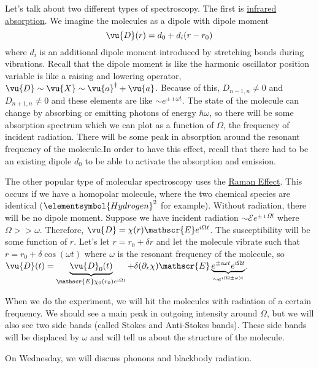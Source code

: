 \documentclass[a4paper,twoside,master.tex]{subfiles}
\begin{document}
Let's talk about two different types of spectroscopy. The first is \underline{infrared absorption}. We imagine the molecules as a dipole with dipole moment
\begin{equation}
    \vu{D}(r) = d_0 + d_i(r-r_0)
\end{equation}
where $ d_i $ is an additional dipole moment introduced by stretching bonds during vibrations. Recall that the dipole moment is like the harmonic oscillator position variable is like a raising and lowering operator, $ \vu{D} \sim \vu{X} \sim \vu{a}^\dagger + \vu{a} $. Because of this, $ D_{n-1, n} \neq 0 $ and $ D_{n+1,n} \neq 0 $ and these elements are like $ \sim e^{\pm\imath\omega t} $. The state of the molecule can change by absorbing or emitting photons of energy $ \hbar \omega $, so there will be some absorption spectrum which we can plot as a function of $ \Omega $, the frequency of incident radiation. There will be some peak in absorption around the resonant frequency of the molecule.In order to have this effect, recall that there had to be an existing dipole $ d_0 $ to be able to activate the absorption and emission.

The other popular type of molecular spectroscopy uses the \underline{Raman Effect}. This occurs if we have a homopolar molecule, where the two chemical species are identical ($ \elementsymbol{Hydrogen}^2 $ for example). Without radiation, there will be no dipole moment. Suppose we have incident radiation $ \sim \mathscr{E} e^{\pm \imath \Omega t} $ where $ \Omega >> \omega $. Therefore, $ \vu{D} = \chi(r) \mathscr{E} e^{\imath \Omega t} $. The susceptibility will be some function of $ r $. Let's let $ r = r_0 + \delta r$ and let the molecule vibrate such that $ r = r_0 + \delta \cos(\omega t) $ where $\omega$ is the resonant frequency of the molecule, so $ \vu{D}(t) = \underbrace{\vu{D}_0(t)}_{\mathscr{E}\chi_0(r_0) e^{\imath \Omega t}} + \delta (\partial_r \chi) \mathscr{E} \underbrace{e^{\pm\imath\omega t} e^{\imath \Omega t}}_{\sim e^{\imath(\Omega \pm \omega) t}} $.

When we do the experiment, we will hit the molecules with radiation of a certain frequency. We should see a main peak in outgoing intensity around $ \Omega $, but we will also see two side bands (called Stokes and Anti-Stokes bands). These side bands will be displaced by $\omega$ and will tell us about the structure of the molecule.

On Wednesday, we will discuss phonons and blackbody radiation.
\end{document}
